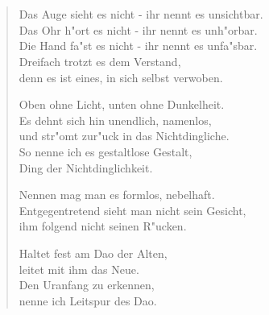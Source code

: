 \documentclass[a4paper,10pt,openany]{book}
\begin{document}
\chapter{}
\begin{verse}
    Das Auge sieht es nicht - ihr nennt es unsichtbar.\\
    Das Ohr h"ort es nicht - ihr nennt es unh"orbar.\\
    Die Hand fa"st es nicht - ihr nennt es unfa"sbar.\\
    Dreifach trotzt es dem Verstand,\\
    denn es ist eines, in sich selbst verwoben.

    Oben ohne Licht, unten ohne Dunkelheit.\\
    Es dehnt sich hin unendlich, namenlos,\\
    und str"omt zur"uck in das Nichtdingliche.\\
    So nenne ich es gestaltlose Gestalt,\\
    Ding der Nichtdinglichkeit.

    Nennen mag man es formlos, nebelhaft.\\
    Entgegentretend sieht man nicht sein Gesicht,\\
    ihm folgend nicht seinen R"ucken.

    Haltet fest am Dao der Alten,\\
    leitet mit ihm das Neue.\\
    Den Uranfang zu erkennen,\\
    nenne ich Leitspur des Dao.
\end{verse}

\end{document}
